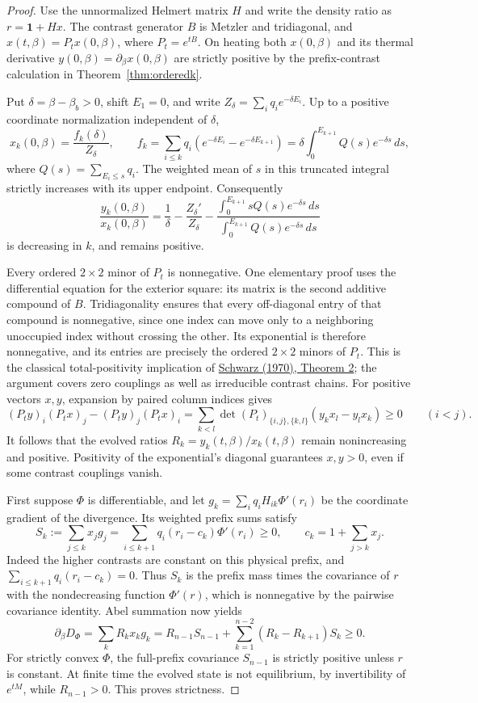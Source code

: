 \documentclass[11pt]{article}
\begin{document}
\begin{proof}
Use the unnormalized Helmert matrix $H$ and write the density ratio as
$r=\mathbf1+Hx$. The contrast generator $B$ is Metzler and tridiagonal,
and $x(t,\beta)=P_t x(0,\beta)$, where $P_t=e^{tB}$.
On heating both $x(0,\beta)$ and its thermal derivative
$y(0,\beta)=\partial_\beta x(0,\beta)$ are strictly positive by the
prefix-contrast calculation in Theorem~\ref{thm:orderedk}.

Put $\delta=\beta-\beta_b>0$, shift $E_1=0$, and write
$Z_\delta=\sum_iq_i e^{-\delta E_i}$.
Up to a positive coordinate normalization independent of $\delta$,
\[
x_k(0,\beta)=\frac{f_k(\delta)}{Z_\delta},\qquad
f_k=\sum_{i\leq k}q_i
 (e^{-\delta E_i}-e^{-\delta E_{k+1}})
=\delta\int_0^{E_{k+1}}Q(s)e^{-\delta s}\,ds,
\]
where $Q(s)=\sum_{E_i\leq s}q_i$.
The weighted mean of $s$ in this truncated integral strictly increases
with its upper endpoint. Consequently
\[
\frac{y_k(0,\beta)}{x_k(0,\beta)}
=\frac1\delta-\frac{Z_\delta'}{Z_\delta}
 -\frac{\int_0^{E_{k+1}}sQ(s)e^{-\delta s}\,ds}
        {\int_0^{E_{k+1}}Q(s)e^{-\delta s}\,ds}
\]
is decreasing in $k$, and remains positive.

Every ordered $2\times2$ minor of $P_t$ is nonnegative. One elementary
proof uses the differential equation for the exterior square: its
matrix is the second additive compound of $B$. Tridiagonality ensures
that every off-diagonal entry of that compound is nonnegative, since
one index can move only to a neighboring unoccupied index without
crossing the other. Its exponential is therefore nonnegative, and its
entries are precisely the ordered $2\times2$ minors of $P_t$.
This is the classical total-positivity implication of
\href{https://msp.org/pjm/1970/32-1/pjm-v32-n1-p20-p.pdf}{Schwarz (1970),
Theorem 2}; the argument covers zero couplings as well as irreducible
contrast chains.
For positive vectors $x,y$, expansion by paired column indices gives
\[
(P_ty)_i(P_tx)_j-(P_ty)_j(P_tx)_i
=\sum_{k<l}\det(P_t)_{\{i,j\},\{k,l\}}
  (y_kx_l-y_lx_k)\geq0\qquad(i<j).
\]
It follows that the evolved ratios $R_k=y_k(t,\beta)/x_k(t,\beta)$
remain nonincreasing and positive. Positivity of the exponential's
diagonal guarantees $x,y>0$, even if some contrast couplings vanish.

First suppose $\Phi$ is differentiable, and let
$g_k=\sum_iq_i H_{ik}\Phi'(r_i)$ be the coordinate gradient of the
divergence. Its weighted prefix sums satisfy
\[
S_k:=\sum_{j\leq k}x_jg_j
=\sum_{i\leq k+1}q_i(r_i-c_k)\Phi'(r_i)\geq0,
\qquad c_k=1+\sum_{j>k}x_j.
\]
Indeed the higher contrasts are constant on this physical prefix,
and $\sum_{i\leq k+1}q_i(r_i-c_k)=0$. Thus $S_k$ is the prefix mass
times the covariance of $r$ with the nondecreasing function $\Phi'(r)$,
which is nonnegative by the pairwise covariance identity.
Abel summation now yields
\[
\partial_\beta D_\Phi
=\sum_kR_k x_kg_k
=R_{n-1}S_{n-1}
 +\sum_{k=1}^{n-2}(R_k-R_{k+1})S_k\geq0.
\]
For strictly convex $\Phi$, the full-prefix covariance $S_{n-1}$ is
strictly positive unless $r$ is constant. At finite time the evolved
state is not equilibrium, by invertibility of $e^{tM}$, while
$R_{n-1}>0$. This proves strictness.


\end{proof}
\end{document}
